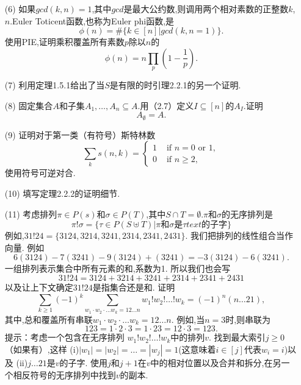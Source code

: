 \documentclass{ctexbook}
\begin{document}
\begin{enumerate}
	\item[(6)]
	如果$gcd(k,n)=1$,其中$gcd$是最大公约数,则调用两个相对素数的正整数$k$,$n$.Euler Toticent函数,也称为Euler phi函数,是
	$$
	\phi(n)=\#\{k\in[n]|gcd(k,n=1)\}.
	$$
	使用PIE,证明乘积覆盖所有素数$p$除以$n$的
	$$
	\phi(n)=n\prod_p\left(1-\frac{1}{p}\right).
	$$
\end{enumerate}

\begin{enumerate}
	\item[(7)]
     利用定理1.5.1给出了当$S$是有限的时引理2.2.1的另一个证明. 
\end{enumerate}

\begin{enumerate}
	\item[(8)]  固定集合$A$和子集$A_1,\dots,A_n\subseteq A$.用（2.7）定义$I\subseteq[n]$的$A_I$.证明$$A_\emptyset=A.$$
\end{enumerate}


\begin{enumerate}
	\item[(9)] 证明对于第一类（有符号）斯特林数
     $$
     \sum_ks(n,k)=\begin{cases}
     1 & \text { if }n=0 \text { or }1, \\
     0 & \text { if }n\ge2,
     \end{cases} 
     $$
	使用符号可逆对合.
\end{enumerate}

\begin{enumerate}
	\item[(10)]  填写定理2.2.2的证明细节. 
\end{enumerate}

\begin{enumerate}
	\item[(11)]  
	考虑排列$\pi\in P(s)$和$\sigma\in P(T)$,其中$S\cap T=\emptyset$.$\pi$和$\sigma$的无序排列是
	$$
	\pi!\sigma=\{
	\tau\in P(S\uplus T)|\pi\text{和}\sigma\text{是}\tau text{的子字}
	\}
	$$
	例如,$31!24=\{
	3124,3214,3241,2314,2341,2431
	\}.$
	我们把排列的线性组合当作向量. 例如
	$$6(3124)-7(3241)-9(3124)+(3241)=-3(3124)-6(3241).$$
	一组排列表示集合中所有元素的和,系数为1. 所以我们也会写
	$$31!24=3124+3214+3241+2314+2341+2431$$以及让上下文确定$31!24$是指集合还是和. 证明
	$$
	\sum_{k\ge1}(-1)^k\sum_{w_1\cdot w_2\cdot \dots w_k=12\dots n}w_1!w_2!\dots !w_k=(-1)^n(n\dots21),
	$$
	其中,总和覆盖所有串联$w_1\cdot w_2\cdot \dots w_k=12\dots n$. 例如,当$n=3$时,则串联为$$123=1\cdot2\cdot3=1\cdot23=12\cdot3=123.$$
	提示：考虑一个包含在无序排列
	$w_1!w_2!\dots !w_k$中的排列$v$. 找到最大索引$j\ge0$（如果有）,这样
	(i)$|w_1|=|w_2|=\dots=|w_j|=1$(这意味着$i\in[j]$代表$w_i=i$)以及
	(ii)$j\dots21$是$v$的子字.
	使用$j$和$j+1$在$v$中的相对位置以及合并和拆分,在另一个相反符号的无序排列中找到$v$的副本. 
\end{enumerate}
\end{document}
